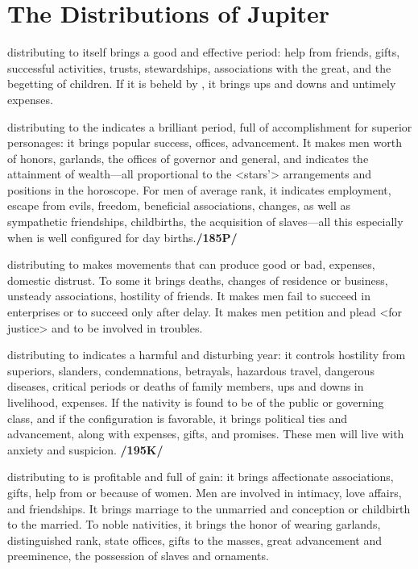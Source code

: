 \section{The Distributions of Jupiter}

\Jupiter\xspace distributing to itself brings a good and effective period: help from friends, gifts, successful activities, trusts, stewardships, associations with the great, and the begetting of children. If it is beheld by \Mars, it brings ups and downs and untimely expenses.

\Jupiter\xspace distributing to the \Sun\xspace indicates a brilliant period, full of accomplishment for superior
personages: it brings popular success, offices, advancement. It makes men worth of honors, garlands, the offices of governor and general, and indicates the attainment of wealth—all proportional to the <stars’> arrangements and positions in the horoscope. For men of average rank, it indicates employment, escape from evils, freedom, beneficial associations, changes, as well as sympathetic friendships, childbirths, the acquisition of slaves—all this especially when \Jupiter\xspace is well configured for day births.\textbf{/185P/}

\Jupiter\xspace distributing to \Saturn\xspace makes movements that can produce good or bad, expenses, domestic distrust. To some it brings deaths, changes of residence or business, unsteady associations, hostility of friends. It makes men fail to succeed in enterprises or to succeed only after delay. It makes men petition and plead <for justice> and to be involved in troubles.

\Jupiter\xspace distributing to \Mars\xspace indicates a harmful and disturbing year: it controls hostility from superiors, slanders, condemnations, betrayals, hazardous travel, dangerous diseases, critical periods or deaths of family members, ups and downs in livelihood, expenses. If the nativity is found to be of the public or governing class, and if the configuration is favorable, it brings political ties and advancement, along with expenses, gifts, and promises. These men will live with anxiety and suspicion. \textbf{/195K/}

\Jupiter\xspace distributing to \Venus\xspace is profitable and full of gain: it brings affectionate associations, gifts, help from or because of women. Men are involved in intimacy, love affairs, and friendships. It brings marriage to the unmarried and conception or childbirth to the married. To noble nativities, it brings the honor of wearing garlands, distinguished rank, state offices, gifts to the masses, great advancement and preeminence, the possession of slaves and ornaments.

